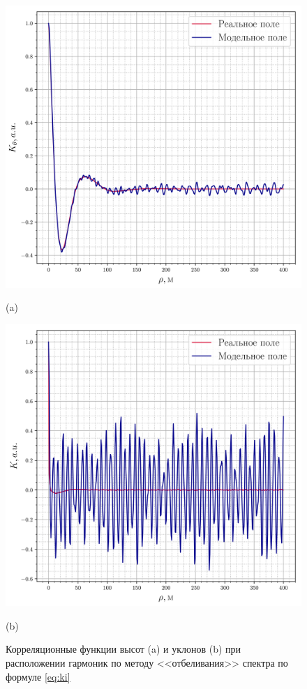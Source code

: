 \documentclass[a4paper,14pt]{extarticle}
\begin{document}
\begin{figure}[ht]
    \centering
    \begin{minipage}{0.49\linewidth}
        \centering
        \includegraphics[width=\linewidth]{fig/correlation_height_height2.png}


        (a)
    \end{minipage}
    \begin{minipage}{0.49\linewidth}
        \centering
        \includegraphics[width=\linewidth]{fig/correlation_angles_height2.png}



        (b)
    \end{minipage}

    \caption{ Корреляционные функции высот (a) и уклонов (b) при расположении гармоник
    по методу <<отбеливания>> спектра по формуле \eqref{eq:ki} }
    \label{fig:ki}
\end{figure}
\end{document}
